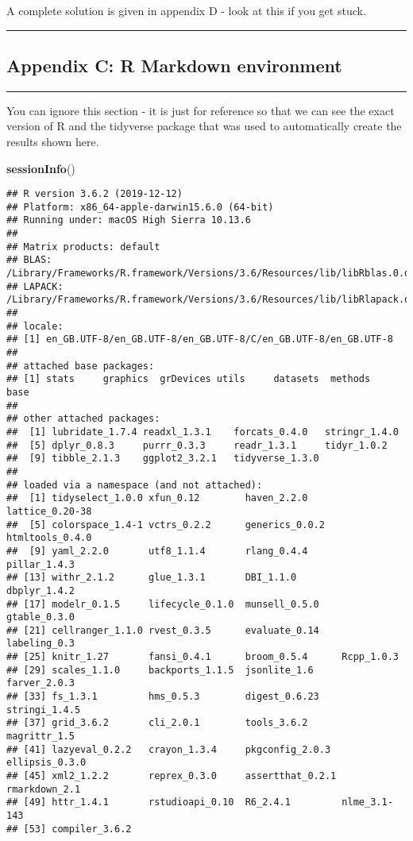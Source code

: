 \documentclass[
]{article}
\newenvironment{Shaded}{\begin{snugshade}}{\end{snugshade}}
\newcommand{\KeywordTok}[1]{\textcolor[rgb]{0.13,0.29,0.53}{\textbf{#1}}}
\newcommand{\NormalTok}[1]{#1}
\begin{document}
A complete solution is given in appendix D - look at this if you get
stuck.

\begin{center}\rule{0.5\linewidth}{0.5pt}\end{center}

\hypertarget{appendix-c-r-markdown-environment}{%
\subsection{Appendix C: R Markdown
environment}\label{appendix-c-r-markdown-environment}}

\begin{center}\rule{0.5\linewidth}{0.5pt}\end{center}

You can ignore this section - it is just for reference so that we can
see the exact version of R and the tidyverse package that was used to
automatically create the results shown here.

\begin{Shaded}
\begin{Highlighting}[]
\KeywordTok{sessionInfo}\NormalTok{()}
\end{Highlighting}
\end{Shaded}

\begin{verbatim}
## R version 3.6.2 (2019-12-12)
## Platform: x86_64-apple-darwin15.6.0 (64-bit)
## Running under: macOS High Sierra 10.13.6
## 
## Matrix products: default
## BLAS:   /Library/Frameworks/R.framework/Versions/3.6/Resources/lib/libRblas.0.dylib
## LAPACK: /Library/Frameworks/R.framework/Versions/3.6/Resources/lib/libRlapack.dylib
## 
## locale:
## [1] en_GB.UTF-8/en_GB.UTF-8/en_GB.UTF-8/C/en_GB.UTF-8/en_GB.UTF-8
## 
## attached base packages:
## [1] stats     graphics  grDevices utils     datasets  methods   base     
## 
## other attached packages:
##  [1] lubridate_1.7.4 readxl_1.3.1    forcats_0.4.0   stringr_1.4.0  
##  [5] dplyr_0.8.3     purrr_0.3.3     readr_1.3.1     tidyr_1.0.2    
##  [9] tibble_2.1.3    ggplot2_3.2.1   tidyverse_1.3.0
## 
## loaded via a namespace (and not attached):
##  [1] tidyselect_1.0.0 xfun_0.12        haven_2.2.0      lattice_0.20-38 
##  [5] colorspace_1.4-1 vctrs_0.2.2      generics_0.0.2   htmltools_0.4.0 
##  [9] yaml_2.2.0       utf8_1.1.4       rlang_0.4.4      pillar_1.4.3    
## [13] withr_2.1.2      glue_1.3.1       DBI_1.1.0        dbplyr_1.4.2    
## [17] modelr_0.1.5     lifecycle_0.1.0  munsell_0.5.0    gtable_0.3.0    
## [21] cellranger_1.1.0 rvest_0.3.5      evaluate_0.14    labeling_0.3    
## [25] knitr_1.27       fansi_0.4.1      broom_0.5.4      Rcpp_1.0.3      
## [29] scales_1.1.0     backports_1.1.5  jsonlite_1.6     farver_2.0.3    
## [33] fs_1.3.1         hms_0.5.3        digest_0.6.23    stringi_1.4.5   
## [37] grid_3.6.2       cli_2.0.1        tools_3.6.2      magrittr_1.5    
## [41] lazyeval_0.2.2   crayon_1.3.4     pkgconfig_2.0.3  ellipsis_0.3.0  
## [45] xml2_1.2.2       reprex_0.3.0     assertthat_0.2.1 rmarkdown_2.1   
## [49] httr_1.4.1       rstudioapi_0.10  R6_2.4.1         nlme_3.1-143    
## [53] compiler_3.6.2
\end{verbatim}
\end{document}

